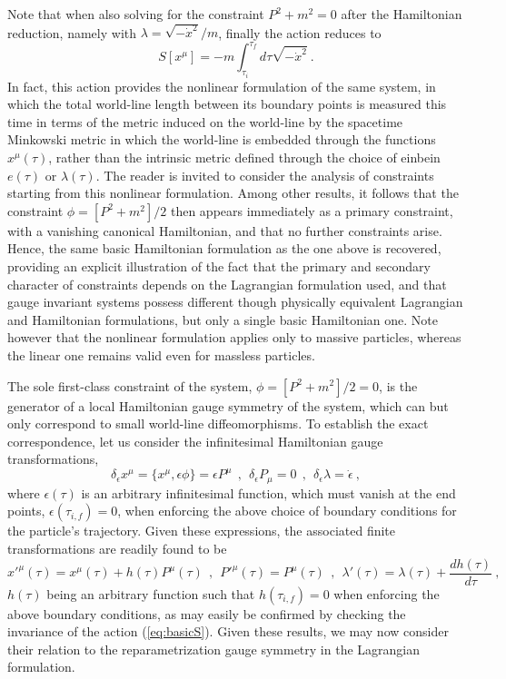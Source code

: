 \documentclass[a4paper,11pt]{article}
\begin{document}
Note that when also solving for the constraint $P^2+m^2=0$ after
the Hamiltonian reduction, namely with $\lambda=\sqrt{-\dot{x}^2}/m$, finally
the action reduces to
\begin{equation}
S[x^\mu]=-m\int_{\tau_i}^{\tau_f}d\tau\sqrt{-\dot{x}^2}\ .
\end{equation}
In fact, this action provides the nonlinear formulation of the same system,
in which the total world-line length between its boundary points is measured
this time in terms of the metric induced on the world-line by the
spacetime Minkowski metric in which the world-line is embedded through the
functions $x^\mu(\tau)$, rather than the intrinsic metric defined through
the choice of einbein $e(\tau)$ or $\lambda(\tau)$. The reader is invited
to consider the analysis of constraints star\-ting from this nonlinear
formulation. Among other results, it follows that the constraint
$\phi=[P^2+m^2]/2$ then appears immediately as a primary constraint,
with a vanishing canonical Hamiltonian, and that no further constraints arise.
Hence, the same basic Hamiltonian formulation as the one above is
recovered, providing an explicit illustration of the fact that the primary
and secondary character of constraints depends on the Lagrangian formulation
used, and that gauge invariant systems possess different though physically
equivalent Lagrangian and Hamiltonian formulations, but only a single basic
Hamiltonian one. Note however that the nonlinear formulation applies
only to massive particles, whereas the linear one remains valid even for
massless particles.

The sole first-class constraint of the system, $\phi=[P^2+m^2]/2=0$, is the
generator of a local Hamiltonian gauge symmetry of the system, which can but
only correspond to small world-line diffeomorphisms. To establish the
exact correspondence, let us consider the infinitesimal Hamiltonian gauge
transformations,
\begin{equation}
\delta_\epsilon x^\mu=\{x^\mu,\epsilon\phi\}=\epsilon P^\mu\ \ ,\ \ 
\delta_\epsilon P_\mu=0\ \ ,\ \ 
\delta_\epsilon\lambda=\dot{\epsilon}\ ,
\end{equation}
where $\epsilon(\tau)$ is an arbitrary infinitesimal function, which
must vanish at the end points, $\epsilon(\tau_{i,f})=0$, when enforcing
the above choice of boundary conditions for the particle's trajectory.
Given these expressions, the associated finite transformations are
readily found to be
\begin{equation}
{x'}^\mu(\tau)=x^\mu(\tau)+h(\tau)P^\mu(\tau)\ \ ,\ \ 
{P'}^\mu(\tau)=P^\mu(\tau)\ \ ,\ \ 
\lambda'(\tau)=\lambda(\tau)+\frac{dh(\tau)}{d\tau}\ ,
\label{eq:finitegauge}
\end{equation}
$h(\tau)$ being an arbitrary function such that $h(\tau_{i,f})=0$ when
enforcing the above boundary conditions, as may easily be confirmed by
checking the invariance of the action (\ref{eq:basicS}). Given these results,
we may now consider their relation to the reparametrization gauge symmetry
in the Lagrangian formulation.
\end{document}
